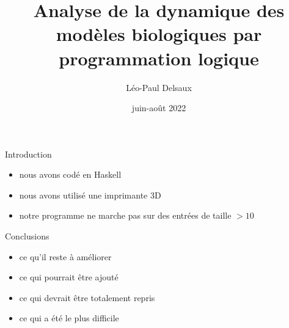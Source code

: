 \documentclass{beamer}
\title{Analyse de la dynamique des modèles biologiques par programmation logique}
\author{Léo-Paul Delsaux}
\institute{Stage effectué au laboratoire CRIStAL de Villeneuve-d'Ascq}
\date{juin-août 2022}
\begin{document}
\maketitle

\begin{frame}{Introduction}

  \begin{itemize}
  \item nous avons codé en Haskell

  \item nous avons utilisé une imprimante 3D

    \pause


  \item notre programme ne marche pas sur des entrées de taille $>10$

  \end{itemize}
  
\end{frame}

\begin{frame}{Conclusions}

  \begin{itemize}
  \item ce qu'il reste à améliorer

  \item ce qui pourrait être ajouté

  \item ce qui devrait être totalement repris

  \item ce qui a été le plus difficile
  \end{itemize}
  
\end{frame}
\end{document}
